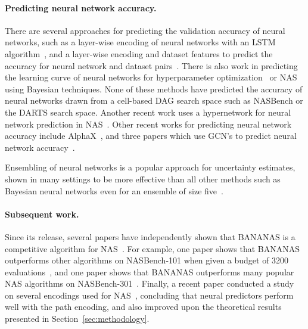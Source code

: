 \documentclass[11pt]{article}
\numberwithin{equation}{section}
\numberwithin{figure}{section}
\theoremstyle{plain}
\theoremstyle{definition}
\let\citep\cite
\begin{document}
\paragraph{Predicting neural network accuracy.}
There are several approaches for predicting the validation accuracy of 
neural networks, such as a layer-wise encoding of neural networks with an 
LSTM algorithm~\cite{peephole}, and a layer-wise encoding and dataset 
features to predict the accuracy for neural network and dataset pairs~\cite{tapas}. 
There is also work in predicting the learning curve of neural networks for hyperparameter 
optimization~\cite{klein2016learning, domhan2015speeding} 
or NAS~\cite{baker2017accelerating} using Bayesian techniques. 
None of these methods have predicted the accuracy of neural networks 
drawn from a cell-based DAG search space such as NASBench or the DARTS 
search space.
Another recent work uses a hypernetwork for neural network prediction 
in NAS~\cite{zhang2018graph}.
Other recent works for predicting neural network accuracy include AlphaX~\cite{alphax},
and three papers which use GCN's to predict neural network 
accuracy~\cite{ma2019deep, shi2019multi, wen2019neural}.

Ensembling of neural networks is a popular approach for uncertainty
estimates, shown in many settings to be more effective than all other methods such as
Bayesian neural networks even for an ensemble of size five~\cite{lakshminarayanan2017simple, beluch2018power, choi2016ensemble, snoek2019can}.

\paragraph{Subsequent work.}
Since its release, several papers have independently shown that BANANAS is a
competitive algorithm for NAS~\citep{remaade, nasbench301,nguyen2020optimal, nasbowl, npenas}.
For example, one paper shows that BANANAS outperforms other algorithms
on NASBench-101
when given a budget of 3200 evaluations~\citep{remaade},
and one paper shows that BANANAS outperforms many popular NAS 
algorithms on NASBench-301~\citep{nasbench301}.
Finally, a recent paper conducted a study on several encodings used for 
NAS~\cite{white2020study}, concluding that neural predictors perform well
with the path encoding, and also improved upon the theoretical results presented in
Section~\ref{sec:methodology}.
\end{document}
